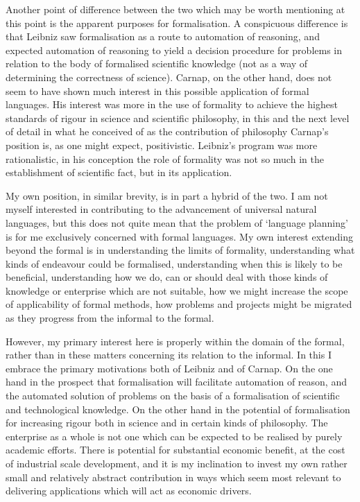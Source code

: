 \documentclass[numreferences]{rbjk}
\begin{document}
\begin{article}
Another point of difference between the two which may be worth mentioning at this point is the apparent purposes for formalisation.
A conspicuous difference is that Leibniz saw formalisation as a route to automation of reasoning, and expected automation of reasoning to yield a decision procedure for problems in relation to the body of formalised scientific knowledge (not as a way of determining the correctness of science).
Carnap, on the other hand,  does not seem to have shown much interest in this possible application of formal languages.
His interest was more in the use of formality to achieve the highest standards of rigour in science and scientific philosophy, in this and the next level of detail in what he conceived of as the contribution of philosophy Carnap's position is, as one might expect, positivistic.
Leibniz's program was more rationalistic, in his conception the role of formality was not so much in the establishment of scientific fact, but in its application.

My own position, in similar brevity, is in part a hybrid of the two.
I am not myself interested in contributing to the advancement of universal natural languages, but this does not quite mean that the problem of `language planning' is for me exclusively concerned with formal languages.
My own interest extending beyond the formal is in understanding the limits of formality, understanding what kinds of endeavour could be formalised, understanding when this is likely to be beneficial, understanding how we do, can or should deal with those kinds of knowledge or enterprise which are not suitable, how we might increase the scope of applicability of formal methods, how problems and projects might be migrated as they progress from the informal to the formal.

However, my primary interest here is properly within the domain of the formal, rather than in these matters concerning its relation to the informal.
In this I embrace the primary motivations both of Leibniz and of Carnap.
On the one hand in the prospect that formalisation will facilitate automation of reason, and the automated solution of problems on the basis of a formalisation of scientific and technological knowledge.
On the other hand in the potential of formalisation for increasing rigour both in science and in certain kinds of philosophy.
The enterprise as a whole is not one which can be expected to be realised by purely academic efforts.
There is potential for substantial economic benefit, at the cost of industrial scale development, and it is my inclination to invest my own rather small and relatively abstract contribution in ways which seem most relevant to delivering applications which will act as economic drivers.


\end{article}
\end{document}
